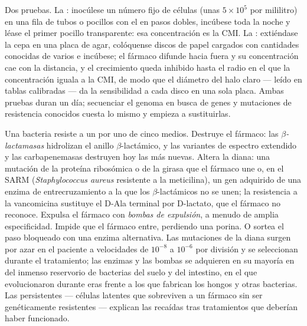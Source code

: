 \begin{method}\label{met:b3:bacteriology:mic}
Dos pruebas. La \emph{}: inocúlese un número fijo de
células (unas $5\times 10^{5}$ por mililitro) en una fila de tubos o
pocillos con el  en pasos dobles, incúbese toda la noche y
léase el primer pocillo transparente: esa concentración es la CMI. La
\emph{}: extiéndase la cepa en una placa de agar,
colóquense discos de papel cargados con cantidades conocidas de varios
 e incúbese; el fármaco difunde hacia fuera y su
concentración cae con la distancia, y el crecimiento queda inhibido hasta
el radio en el que la concentración iguala a la CMI, de modo que el
diámetro del halo claro --- leído en tablas calibradas --- da la
sensibilidad a cada disco en una sola placa. Ambas pruebas duran un día;
secuenciar el genoma en busca de genes y mutaciones de resistencia
conocidos cuesta lo mismo y empieza a sustituirlas.
\end{method}

\begin{definition}[Resistencia]\label{def:b3:bacteriology:resistance}
Una bacteria resiste a un  por uno de cinco medios. Destruye
el fármaco: las \emph{$\beta$-lactamasas} hidrolizan el anillo
$\beta$-lactámico,
y las variantes de espectro extendido y las carbapenemasas destruyen hoy
las más nuevas. Altera la diana: una mutación de la proteína ribosómica o
de la girasa que el fármaco une o, en el SARM (\emph{Staphylococcus
aureus} resistente a la meticilina), un gen adquirido de una enzima de
entrecruzamiento a la que los $\beta$-lactámicos no se unen; la
resistencia a
la vancomicina sustituye el D-Ala terminal por D-lactato, que el fármaco
no reconoce. Expulsa el fármaco con \emph{bombas de expulsión}, a menudo
de amplia especificidad. Impide que el fármaco entre, perdiendo una
porina. O sortea el paso bloqueado con una enzima alternativa. Las
mutaciones de la diana surgen por azar en el paciente a velocidades de
$10^{-8}$ a $10^{-6}$ por división y se seleccionan durante el
tratamiento; las enzimas y las bombas se adquieren en su mayoría en
 del inmenso reservorio de bacterias del suelo y del intestino,
en el que evolucionaron durante eras frente a los  que
fabrican los hongos y otras bacterias. Las persistentes --- células
latentes que sobreviven a un fármaco sin ser genéticamente resistentes
--- explican las recaídas tras tratamientos que deberían haber
funcionado.
\end{definition}


